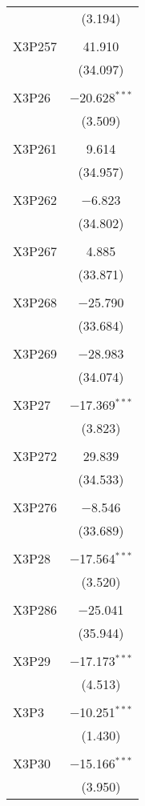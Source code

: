 \begin{table}[!htbp]
\begin{tabular}{@{\extracolsep{5pt}}lc}
  & (3.194) \\ 
  & \\ 
 X3P257 & 41.910 \\ 
  & (34.097) \\ 
  & \\ 
 X3P26 & $-$20.628$^{***}$ \\ 
  & (3.509) \\ 
  & \\ 
 X3P261 & 9.614 \\ 
  & (34.957) \\ 
  & \\ 
 X3P262 & $-$6.823 \\ 
  & (34.802) \\ 
  & \\ 
 X3P267 & 4.885 \\ 
  & (33.871) \\ 
  & \\ 
 X3P268 & $-$25.790 \\ 
  & (33.684) \\ 
  & \\ 
 X3P269 & $-$28.983 \\ 
  & (34.074) \\ 
  & \\ 
 X3P27 & $-$17.369$^{***}$ \\ 
  & (3.823) \\ 
  & \\ 
 X3P272 & 29.839 \\ 
  & (34.533) \\ 
  & \\ 
 X3P276 & $-$8.546 \\ 
  & (33.689) \\ 
  & \\ 
 X3P28 & $-$17.564$^{***}$ \\ 
  & (3.520) \\ 
  & \\ 
 X3P286 & $-$25.041 \\ 
  & (35.944) \\ 
  & \\ 
 X3P29 & $-$17.173$^{***}$ \\ 
  & (4.513) \\ 
  & \\ 
 X3P3 & $-$10.251$^{***}$ \\ 
  & (1.430) \\ 
  & \\ 
 X3P30 & $-$15.166$^{***}$ \\ 
  & (3.950) \\ 

\end{tabular}
\end{table}
